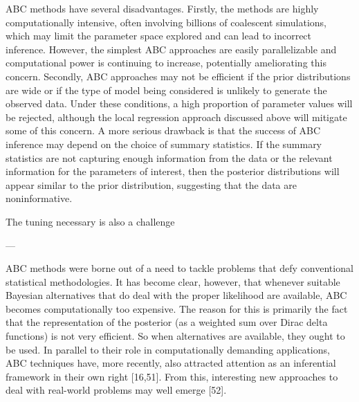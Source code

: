ABC methods have several disadvantages. Firstly, the methods are highly computationally intensive, often involving billions of coalescent simulations, which may limit the parameter space explored and can lead to incorrect inference. However, the simplest ABC approaches are easily parallelizable and computational power is continuing to increase, potentially ameliorating this concern. Secondly, ABC approaches may not be efficient if the prior distributions are wide or if the type of model being considered is unlikely to generate the observed data. Under these conditions, a high proportion of parameter values will be rejected, although the local regression  approach discussed above will mitigate some of this concern. A more serious drawback is that the success of ABC inference may depend on the choice of summary statistics. If the summary statistics are not capturing enough information from the data or the relevant information for the parameters of interest, then the posterior distributions will appear similar to the prior distribution, suggesting that the data are noninformative. 


The tuning necessary is also a challenge

---

ABC methods were borne out of a need to tackle problems that defy conventional statistical methodologies. It has become clear, however, that whenever suitable Bayesian alternatives that do deal with the proper likelihood are available, ABC becomes computationally too expensive. The reason for this is primarily the fact that the representation of the posterior (as a weighted sum over Dirac delta functions) is not very efficient. So when alternatives are available, they ought to be used. In parallel to their role in computationally demanding applications, ABC techniques have, more recently, also attracted attention as an inferential framework in their own right [16,51]. From this, interesting new approaches to deal with real-world problems may well emerge [52].

